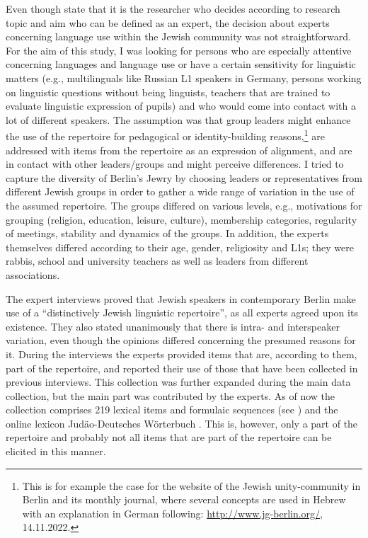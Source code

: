 \documentclass[output=paper]{langscibook}
\begin{document}
Even though \citet[443]{MeuserNagel1991} state that it is the researcher who decides according to research topic and aim who can be defined as an expert, the decision about experts concerning language use within the Jewish community was not straightforward. For the aim of this study, I was looking for persons who are especially attentive concerning languages and language use or have a certain sensitivity for linguistic matters (e.g., multilinguals like Russian L1 speakers in Germany, persons working on linguistic questions without being linguists, teachers that are trained to evaluate linguistic expression of pupils) and who would come into contact with a lot of different speakers. The assumption was that group leaders might enhance the use of the repertoire for pedagogical or identity-building reasons,\footnote{This is for example the case for the website of the Jewish unity-community in Berlin and its monthly journal, where several concepts are used in Hebrew with an explanation in German following: \url{http://www.jg-berlin.org/}, 14.11.2022.} are addressed with items from the repertoire as an expression of alignment, and are in contact with other leaders/groups and might perceive differences. I tried to capture the diversity of Berlin’s Jewry by choosing leaders or representatives from different Jewish groups in order to gather a wide range of variation in the use of the assumed repertoire. The groups differed on various levels, e.g., motivations for grouping (religion, education, leisure, culture), membership categories, regularity of meetings, stability and dynamics of the groups. In addition, the experts themselves differed according to their age, gender, religiosity and L1s; they were rabbis, school and university teachers as well as leaders from different associations.

The expert interviews proved that Jewish speakers in contemporary Berlin make use of a “distinctively Jewish linguistic repertoire”, as all experts agreed upon its existence. They also stated unanimously that there is intra- and interspeaker variation, even though the opinions differed concerning the presumed reasons for it. During the interviews the experts provided items that are, according to them, part of the repertoire, and reported their use of those that have been collected in previous interviews. This collection was further expanded during the main data collection, but the main part was contributed by the experts. As of now the collection comprises 219 lexical items and formulaic sequences (see \citealt{JahnsToAppear}) and the online lexicon Judäo-Deutsches Wörterbuch \citep{Jahns2022}. This is, however, only a part of the repertoire and probably not all items that are part of the repertoire can be elicited in this manner.
\end{document}
